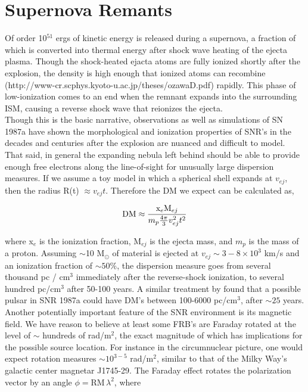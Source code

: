 \documentclass[useAMS,usenatbib]{emulateapj}
\begin{document}

\section{Supernova Remants}
Of order 10$^51$ ergs of kinetic energy is released during a supernova, a 
fraction of which is converted into thermal 
energy after shock wave heating of the 
ejecta plasma. Though the shock-heated ejacta atoms 
are fully ionized shortly after the explosion, the density is high enough that
ionized atoms can recombine (http://www-cr.scphys.kyoto-u.ac.jp/theses/ozawaD.pdf)
rapidly. This phase of low-ionization comes to an end when the remnant expands 
into the surrounding ISM, causing a reverse shock wave that reionizes the ejecta.
\\
Though this is the basic narrative, observations \cite{} as well as simulations \cite{}
 of SN 1987a have shown the morphological and ionization properties of SNR's
 in the decades and centuries after the explosion are nuanced and 
 difficult to model.
That said, in general the expanding nebula left behind 
should be able to provide enough free electrons
along the line-of-sight for unusually large dispersion measures. If we 
assume a toy model in which a spherical shell expands at $v_{ej}$, 
then the radius R(t) $\approx v_{ej} t$. Therefore the DM we expect can be 
calculated as,

\begin{equation}
\textup{DM} \approx  \frac{\textup{x}_e \textup{M}_{ej}}{m_p \frac{4\pi}{3} v_{ej}^2 t^2}
\end{equation}

\noindent where x$_e$ is the ionization fraction, 
M$_{ej}$ is the ejecta mass, and $m_p$ 
is the mass of a proton. Assuming $\sim$10 M$_{\odot}$ of material 
is ejected at $v_{ej}\sim 3-8\times10^3$ km/s and an ionization fraction of 
$\sim 50 \% $, the dispersion measure goes from several 
thousand pc / cm$^3$ immediately
after the reverse-shock ionization, to several hundred pc/cm$^3$ after 50-100 years.
A similar treatment by \cite{1987obs} found that a possible pulsar in SNR 
1987a could have DM's between 100-6000 pc/cm$^3$, after $\sim 25$ years.
\\
Another potentially important feature of the SNR environment is its magnetic
field. We have reason to believe at least some FRB's are Faraday rotated
at the level of $\sim$ hundreds of rad/m$^2$,
the exact magnitude of which has implications for the possible source location. For
instance in the circumnuclear picture, one would expect rotation measures 
$\sim10^{3-5}$ rad/m$^2$, similar to that of the Milky Way's
galactic center magnetar J1745-29. 
The Faraday effect rotates the polarization vector
by an angle $\phi = $RM$\, \lambda^2$, where
\end{document}
